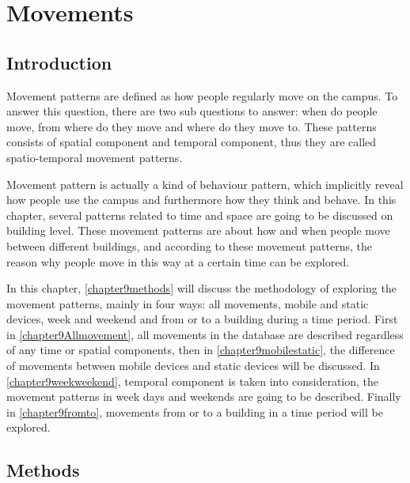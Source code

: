  \chapter{Movements}\label{movements}


\section{Introduction}
Movement patterns are defined as how people regularly move on the campus. To answer this question, there are two sub questions to answer: when do people move, from where do they move and where do they move to. These patterns consists of spatial component and temporal component, thus they are called spatio-temporal movement patterns.

Movement pattern is actually a kind of behaviour pattern, which implicitly reveal how people use the campus and furthermore how they think and behave. In this chapter, several patterns related to time and space are going to be discussed on building level. These movement patterns are about how and when  people move between different buildings, and according to these movement patterns, the reason why people move in this way at a certain time can be explored.

In this chapter, \autoref{chapter9methods} will discuss the methodology of exploring the movement patterns, mainly in four ways: all movements, mobile and static devices, week and weekend and from or to a building during a time period. First in \autoref{chapter9Allmovement}, all movements in the database are described regardless of any time or spatial components, then in \autoref{chapter9mobilestatic}, the difference of movements between mobile devices and static devices will be discussed. In \autoref{chapter9weekweekend}, temporal component is taken into consideration, the movement patterns in week days and weekends are going to be described. Finally in \autoref{chapter9fromto}, movements from or to a building in a time period will be explored. 

\section{Methods}\label{chapter9methods}

